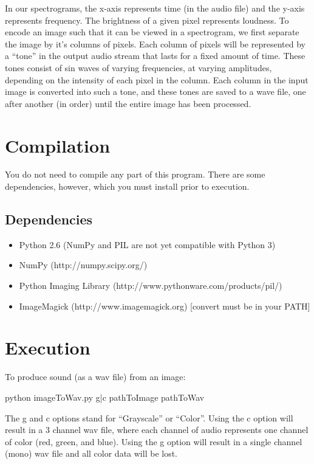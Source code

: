 \documentclass[12pt]{article}
\begin{document}
In our spectrograms, the x-axis represents time (in the audio file) and the y-axis represents frequency. The brightness of a given pixel represents loudness. To encode an image such that it can be viewed in a spectrogram, we first separate the image by it's columns of pixels. Each column of pixels will be represented by a ``tone'' in the output audio stream that lasts for a fixed amount of time. These tones consist of sin waves of varying frequencies, at varying amplitudes, depending on the intensity of each pixel in the column. Each column in the input image is converted into such a tone, and these tones are saved to a wave file, one after another (in order) until the entire image has been processed.



\section{Compilation}

You do not need to compile any part of this program. There are some dependencies, however, which you must install prior to execution.

\subsection{Dependencies}

\begin{itemize}
\item Python 2.6 (NumPy and PIL are not yet compatible with Python 3)
\item NumPy (http://numpy.scipy.org/)
\item Python Imaging Library (http://www.pythonware.com/products/pil/)
\item ImageMagick (http://www.imagemagick.org) [convert must be in your PATH]
\end{itemize}

\section{Execution}

To produce sound (as a wav file) from an image:

python imageToWav.py g|c pathToImage pathToWav

The g and c options stand for ``Grayscale'' or ``Color''. Using the c option will result in a 3 channel wav file, where each channel of audio represents one channel of color (red, green, and blue). Using the g option will result in a single channel (mono) wav file and all color data will be lost.
\end{document}
